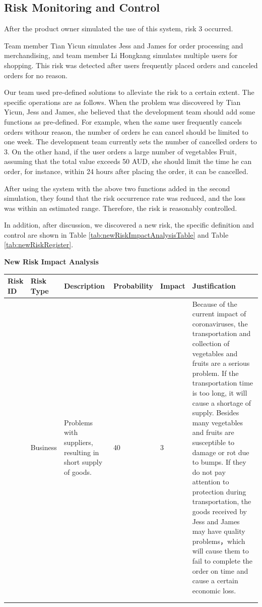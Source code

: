 \clearpage
\subsection{Risk Monitoring and Control}
\label{sub:riskMonitoringandControl2}
After the product owner simulated the use of this system, risk 3 occurred.

Team member Tian Yicun simulates Jess and James for order processing and merchandising, and team member Li Hongkang simulates multiple users for shopping. This risk was detected after users frequently placed orders and canceled orders for no reason.

Our team used pre-defined solutions to alleviate the risk to a certain extent. The specific operations are as follows. When the problem was discovered by Tian Yicun, Jess and James, she believed that the development team should add some functions as pre-defined. For example, when the same user frequently cancels orders withour reason, the number of orders he can cancel should be limited to one week. The development team currently sets the number of cancelled orders to 3. On the other hand, if the user orders a large number of vegetables Fruit, assuming that the total value exceeds 50 AUD, she should limit the time he can order, for instance, within 24 hours after placing the order, it can be cancelled.

After using the system with the above two functions added in the second simulation, they found that the risk occurrence rate was reduced, and the loss was within an estimated range. Therefore, the risk is reasonably controlled.

In addition, after discussion, we discovered a new risk, the specific definition and control are shown in Table \ref{tab:newRiskImpactAnalysisTable} and Table \ref{tab:newRiskRegister}.

\textbf{New Risk Impact Analysis}
\begin{tabularx}{0.95\linewidth}{%
  >{\raggedright\arraybackslash}p{1cm}%
  >{\raggedright\arraybackslash}p{1.2cm}%
  >{\raggedright\arraybackslash}p{2cm}%
  ll%
  >{\raggedright\arraybackslash}X}
  \toprule
  Risk ID & Risk Type & Description & Probability & Impact & Justification\\
  \midrule
  5
  & Business
  & Problems with suppliers, resulting in short supply of goods.
  & 40
  & 3
  & Because of the current impact of coronaviruses, the transportation and collection of vegetables and fruits are a serious problem. If the transportation time is too long, it will cause a shortage of supply. Besides many vegetables and fruits are susceptible to damage or rot due to bumps. If they do not pay attention to protection during transportation, the goods received by Jess and James may have quality problems，which will cause them to fail to complete the order on time and cause a certain economic loss.
  \\
  \bottomrule
  \\
  \caption{New Risk Impact Analysis Table}
  \label{tab:newRiskImpactAnalysisTable}
\end{tabularx}


